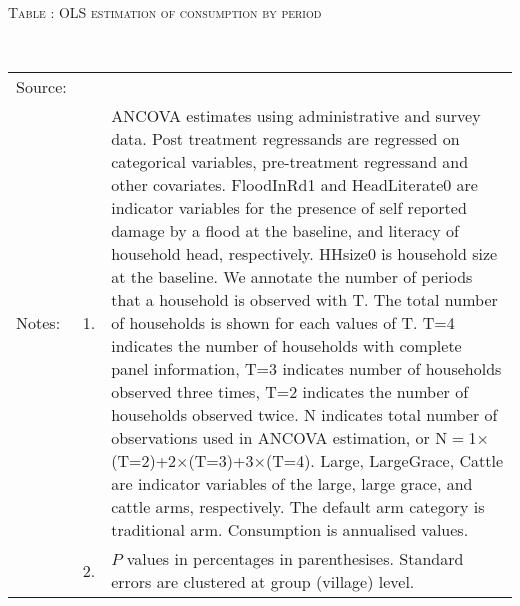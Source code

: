 \hspace{-1cm}\begin{minipage}[t]{14cm}
\hfil\textsc{\normalsize Table \thetable: OLS estimation of consumption by period\label{tab OLS consumption timevarying}}\\
\setlength{\tabcolsep}{1pt}
\setlength{\baselineskip}{8pt}
\renewcommand{\arraystretch}{.55}
\hfil{}\\
\renewcommand{\arraystretch}{.8}
\setlength{\tabcolsep}{1pt}
\begin{tabular}{>{\hfill\scriptsize}p{1cm}<{}>{\hfill\scriptsize}p{.25cm}<{}>{\scriptsize}p{12cm}<{\hfill}}
Source:& \multicolumn{2}{l}{\scriptsize Estimated with GUK administrative and survey data.}\\
Notes: & 1. & ANCOVA estimates using administrative and survey data. Post treatment regressands are regressed on categorical variables, pre-treatment regressand and other covariates. \textsf{FloodInRd1} and \textsf{HeadLiterate0} are indicator variables for the presence of self reported damage by a flood at the baseline, and literacy of household head, respectively. \textsf{HHsize0} is household size at the baseline. We annotate the number of periods that a household is observed with \textsf{T}. The total number of households is shown for each values of \textsf{T}. \textsf{T=4} indicates the number of households with complete panel information, \textsf{T=3} indicates number of households observed three times, \textsf{T=2} indicates the number of households observed twice. \textsf{N} indicates total number of observations used in ANCOVA estimation, or \textsf{N$=$1$\times$(T=2)+2$\times$(T=3)+3$\times$(T=4)}.  \textsf{Large}, \textsf{LargeGrace}, \textsf{Cattle} are indicator variables of the \textsf{large}, \textsf{large grace}, and \textsf{cattle} arms, respectively. The default arm category is \textsf{traditional} arm. Consumption is annualised values. \\
& 2. & $P$ values in percentages in parenthesises. Standard errors are clustered at group (village) level.
\end{tabular}
\end{minipage}


